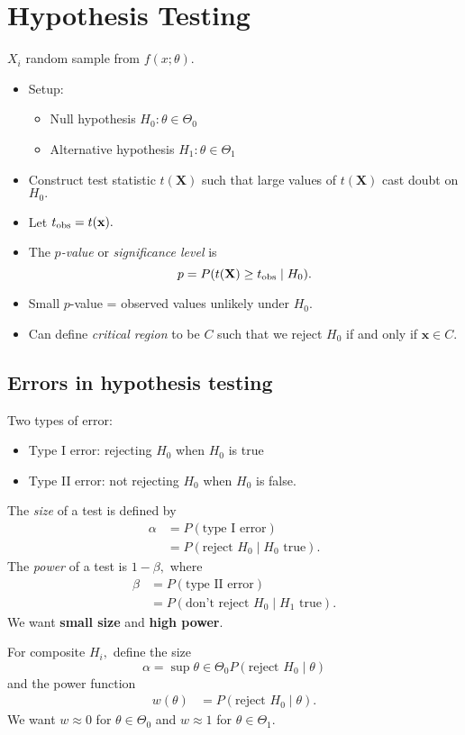 \documentclass[../ds]{subfiles}
\begin{document}
\section{Hypothesis Testing}
$X_i$ random sample from $f(x; \theta).$
\begin{itemize}
	\item Setup:
		\begin{itemize}
			\item Null hypothesis $H_0\colon \theta \in \Theta_0$
			\item Alternative hypothesis $H_1\colon \theta \in \Theta_1$
		\end{itemize}
	\item Construct test statistic $t(\mathbf{X})$ such that large values of $t(\mathbf{X})$ cast doubt on $H_0.$
	\item Let $t_{\text{obs}} = t(\mathbf{x}).$
	\item The \textit{$p$-value} or \textit{significance level} is 
	\[ p = P(t(\mathbf{X}) \geq t_{\text{obs}} \mid H_0). \]
	\item Small $p$-value = observed values unlikely under $H_0.$
	\item Can define \textit{critical region} to be $C$ such that we reject $H_0$ if and only if $\mathbf{x} \in C.$
\end{itemize}

\subsection{Errors in hypothesis testing}
Two types of error:
\begin{itemize}
	\item Type I error: rejecting $H_0$ when $H_0$ is true
	\item Type II error: not rejecting $H_0$ when $H_0$ is false.
\end{itemize}
The \textit{size} of a test is defined by
\begin{align*}
	\alpha
	   &= P(\text{type I error}) \\
	   &= P(\text{reject } H_0 \mid H_0 \text{ true}).
\end{align*}
The \textit{power} of a test is $1-\beta,$ where
\begin{align*}
	\beta
	   &= P(\text{type II error}) \\
	   &= P(\text{don't reject } H_0 \mid H_1 \text{ true}).
\end{align*}
We want \textbf{small size} and \textbf{high power}.

For composite $H_i,$ define the size
\[ \alpha =  \sup{\theta \in \Theta_0}P(\text{reject } H_0 \mid \theta) \]
and the power function
\begin{align*}
	w(\theta)
	   &= P(\text{reject } H_0 \mid \theta).
\end{align*}
We want $w \approx 0$ for $\theta \in \Theta_0$ and $w \approx 1$ for $\theta \in \Theta_1.$
\end{document}
